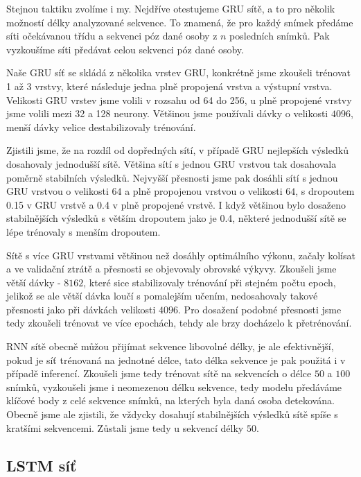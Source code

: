 Stejnou taktiku zvolíme i my. Nejdříve otestujeme GRU sítě, a to pro několik
možností délky analyzované sekvence. To znamená, že pro každý snímek předáme
síti očekávanou třídu a sekvenci póz dané osoby z $n$ posledních snímků. Pak
vyzkoušíme síti předávat celou sekvenci póz dané osoby.

Naše GRU síť se skládá z několika vrstev GRU, konkrétně jsme zkoušeli trénovat
1 až 3 vrstvy, které následuje jedna plně propojená vrstva a výstupní vrstva.
Velikosti GRU vrstev jsme volili v rozsahu od 64 do 256, u plně propojené
vrstvy jsme volili mezi 32 a 128 neurony. Většinou jsme používali dávky o
velikosti $4096$, menší dávky velice destabilizovaly trénování.

Zjistili jsme, že na rozdíl od dopředných sítí, v případě GRU nejlepších
výsledků dosahovaly jednodušší sítě. Většina sítí s jednou GRU vrstvou tak
dosahovala poměrně stabilních výsledků. Nejvyšší přesnosti jsme pak dosáhli
sítí s jednou GRU vrstvou o velikosti $64$ a plně propojenou vrstvou o
velikosti $64$, s dropoutem 0.15 v GRU vrstvě a 0.4 v plně propojené vrstvě. I
když většinou bylo dosaženo stabilnějších výsledků s větším dropoutem jako je
0.4, některé jednodušší sítě se lépe trénovaly s menším dropoutem.

Sítě s více GRU vrstvami většinou než dosáhly optimálního výkonu, začaly
kolísat a ve validační ztrátě a přesnosti se objevovaly obrovské výkyvy.
Zkoušeli jsme větší dávky - $8162$, které sice stabilizovaly trénování při
stejném počtu epoch, jelikož se ale větší dávka loučí s pomalejším učením,
nedosahovaly takové přesnosti jako při dávkách velikosti $4096$. Pro dosažení
podobné přesnosti jsme tedy zkoušeli trénovat ve více epochách, tehdy ale brzy
docházelo k přetrénování.

RNN sítě obecně můžou přijímat sekvence libovolné délky, je ale efektivnější,
pokud je síť trénovaná na jednotné délce, tato délka sekvence je pak použitá i
v případě inferencí. Zkoušeli jsme tedy trénovat sítě na sekvencích o délce
$50$ a $100$ snímků, vyzkoušeli jsme i neomezenou délku sekvence, tedy modelu
předáváme klíčové body z celé sekvence snímků, na kterých byla daná osoba
detekována. Obecně jsme ale zjistili, že vždycky dosahují stabilnějších
výsledků sítě spíše s kratšími sekvencemi. Zůstali jsme tedy u sekvencí délky
$50$.

\subsection{LSTM síť}

